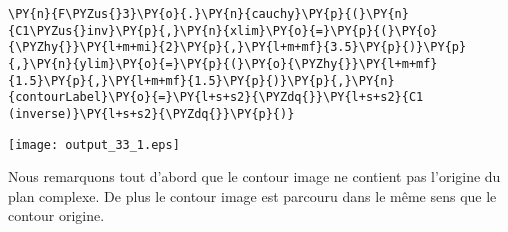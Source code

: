 \begin{tcolorbox}[breakable, size=fbox, boxrule=1pt, pad at break*=1mm,colback=cellbackground, colframe=cellborder]
\begin{Verbatim}[commandchars=\\\{\}]
\PY{n}{F\PYZus{}3}\PY{o}{.}\PY{n}{cauchy}\PY{p}{(}\PY{n}{C1\PYZus{}inv}\PY{p}{,}\PY{n}{xlim}\PY{o}{=}\PY{p}{(}\PY{o}{\PYZhy{}}\PY{l+m+mi}{2}\PY{p}{,}\PY{l+m+mf}{3.5}\PY{p}{)}\PY{p}{,}\PY{n}{ylim}\PY{o}{=}\PY{p}{(}\PY{o}{\PYZhy{}}\PY{l+m+mf}{1.5}\PY{p}{,}\PY{l+m+mf}{1.5}\PY{p}{)}\PY{p}{,}\PY{n}{contourLabel}\PY{o}{=}\PY{l+s+s2}{\PYZdq{}}\PY{l+s+s2}{C1 (inverse)}\PY{l+s+s2}{\PYZdq{}}\PY{p}{)}
\end{Verbatim}
\end{tcolorbox}
\begin{center}
    \texttt{[image: output\_33\_1.eps]}
\end{center}
Nous remarquons tout d'abord que le contour image ne contient pas
l'origine du plan complexe. De plus le contour image est parcouru dans
le même sens que le contour origine. 
